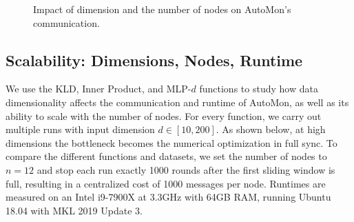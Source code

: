 \begin{figure}
	\centering
	\hfill
	\caption{
		Impact of dimension and the number of nodes on AutoMon's communication.
	}	
	\label{fig:dimension_impact}
\end{figure}


\subsection{Scalability: Dimensions, Nodes, Runtime}
\label{sec:scalability}

We use the KLD, Inner Product, and MLP-$d$ functions to study how data dimensionality affects the communication and runtime of AutoMon, as well as its ability to scale with the number of nodes.
For every function, we carry out multiple runs with input dimension $d \in [10,200]$.
As shown below, at high dimensions the bottleneck becomes the numerical optimization in full sync.
To compare the different functions and datasets, we set the number of nodes to $n=12$ and stop each run exactly 1000 rounds after the first sliding window is full,  resulting in a centralized cost of 1000 messages per node.
Runtimes are measured on an Intel i9-7900X at 3.3GHz with 64GB RAM, running Ubuntu 18.04 with MKL 2019 Update 3.


